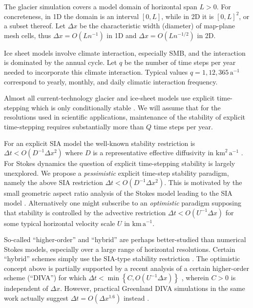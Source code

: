\documentclass[twocolumn,letterpaper]{igs}
\begin{document}
The glacier simulation covers a model domain of horizontal span $L>0$.  For concreteness, in 1D the domain is an interval $[0,L]$, while in 2D it is $[0,L]^2$, or a subset thereof.  Let $\Delta x$ be the characteristic width (diameter) of map-plane mesh cells, thus $\Delta x = O(L n^{-1})$ in 1D and $\Delta x = O(L n^{-1/2})$ in 2D.

Ice sheet models involve climate interaction, especially SMB, and the interaction is dominated by the annual cycle.  Let $q$ be the number of time steps per year needed to incorporate this climate interaction.  Typical values $q=1,12,365 \,\text{a}^{-1}$ correspond to yearly, monthly, and daily climatic interaction frequency.

Almost all current-technology glacier and ice-sheet models use explicit time-stepping which is only conditionally stable \citep{LeVeque2007}.  We will assume that for the resolutions used in scientific applications, maintenance of the stability of explicit time-stepping requires substantially more than $Q$ time steps per year.

For an explicit SIA model the well-known stability restriction is $\Delta t < O(D^{-1} \Delta x^2)$ where $D$ is a representative effective diffusivity in $\text{km}^2\,\text{a}^{-1}$ \citep{Bueleretal2005,HindmarshPayne1996}.
For Stokes dynamics the question of explicit time-stepping stability is largely unexplored.  We propose a \emph{pessimistic} explicit time-step stability paradigm, namely the above SIA restriction $\Delta t < O(D^{-1} \Delta x^2)$.  This is motivated by the small geometric aspect ratio analysis of the Stokes model leading to the SIA model \citep{GreveBlatter2009}.  Alternatively one might subscribe to an \emph{optimistic} paradigm supposing that stability is controlled by the advective restriction $\Delta t < O(U^{-1} \Delta x)$ for some typical horizontal velocity scale $U$ in $\text{km}\,\text{a}^{-1}$.

So-called ``higher-order'' and ``hybrid'' are perhaps better-studied than numerical Stokes models, especially over a large range of horizontal resolutions.  Certain ``hybrid'' schemes simply use the SIA-type stability restriction \citep{Winkelmannetal2011}.  The optimistic concept above is partially supported by a recent analysis of a certain higher-order scheme (``DIVA'') for which $\Delta t < \min\left\{C,O(U^{-1} \Delta x)\right\}$ \citep[equations (52) and (56)]{Robinsonetal2022}, wherein $C>0$ is independent of $\Delta x$.  However, practical Greenland DIVA simulations in the same work actually suggest $\Delta t = O(\Delta x^{1.6})$ instead \citep[Figure 3(a)]{Robinsonetal2022}.
\end{document}
